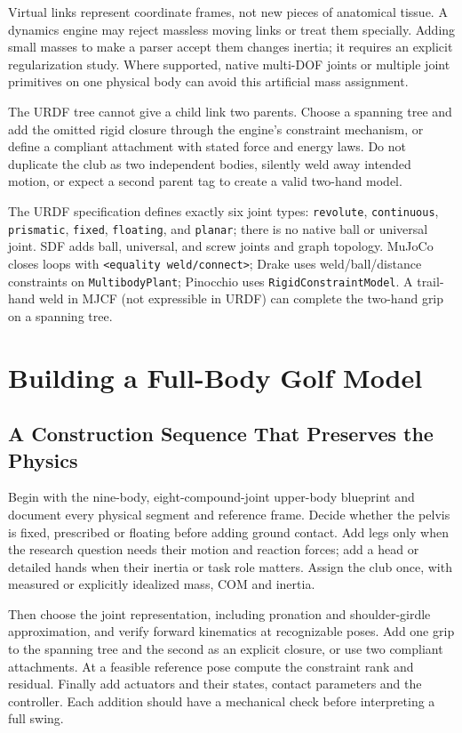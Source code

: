 Virtual links represent coordinate frames, not new pieces of anatomical tissue. A dynamics engine may reject massless moving links or treat them specially. Adding small masses to make a parser accept them changes inertia; it requires an explicit regularization study. Where supported, native multi-DOF joints or multiple joint primitives on one physical body can avoid this artificial mass assignment.

The URDF tree cannot give a child link two parents. Choose a spanning tree and add the omitted rigid closure through the engine's constraint mechanism, or define a compliant attachment with stated force and energy laws. Do not duplicate the club as two independent bodies, silently weld away intended motion, or expect a second parent tag to create a valid two-hand model.

The URDF specification defines exactly six joint types: \texttt{revolute}, \texttt{continuous}, \texttt{prismatic}, \texttt{fixed}, \texttt{floating}, and \texttt{planar}; there is no native ball or universal joint. SDF adds ball, universal, and screw joints and graph topology. MuJoCo closes loops with \texttt{<equality weld/connect>}; Drake uses weld/ball/distance constraints on \texttt{MultibodyPlant}; Pinocchio uses \texttt{RigidConstraintModel}. A trail-hand weld in MJCF (not expressible in URDF) can complete the two-hand grip on a spanning tree.

\section{Building a Full-Body Golf Model}
\label{sec:golf_urdf}

\subsection{A Construction Sequence That Preserves the Physics}

Begin with the nine-body, eight-compound-joint upper-body blueprint and document every physical segment and reference frame. Decide whether the pelvis is fixed, prescribed or floating before adding ground contact. Add legs only when the research question needs their motion and reaction forces; add a head or detailed hands when their inertia or task role matters. Assign the club once, with measured or explicitly idealized mass, COM and inertia.

Then choose the joint representation, including pronation and shoulder-girdle approximation, and verify forward kinematics at recognizable poses. Add one grip to the spanning tree and the second as an explicit closure, or use two compliant attachments. At a feasible reference pose compute the constraint rank and residual. Finally add actuators and their states, contact parameters and the controller. Each addition should have a mechanical check before interpreting a full swing.

